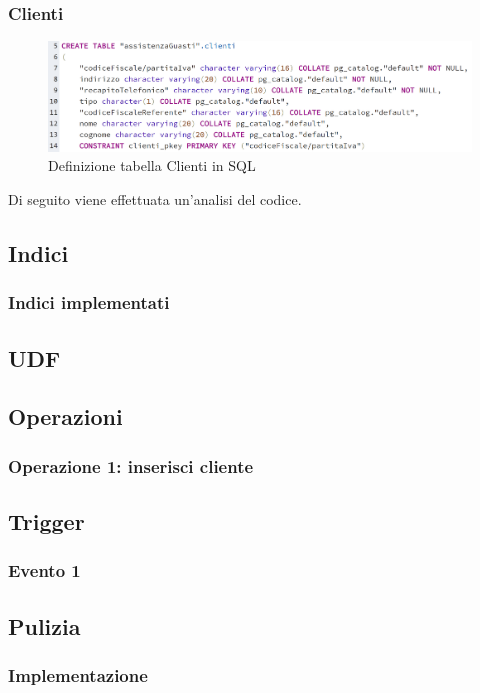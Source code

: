 \documentclass[legalpaper]{article}
\begin{document}
	\subsubsection{Clienti}
		\begin{figure}[h]
			\centering
			\includegraphics[width=0.9\linewidth]{Immagini SQL/Clienti}
			\caption{Definizione tabella Clienti in SQL}
			\label{clientisql}
		\end{figure}
		Di seguito viene effettuata un'analisi del codice. \\
		
\subsection{Indici}
\subsubsection{Indici implementati}
\subsection{UDF}
\subsection{Operazioni}
\subsubsection{Operazione 1: inserisci cliente}
\subsection{Trigger}
\subsubsection{Evento 1}
\subsection{Pulizia}
\subsubsection{Implementazione}
\newpage
\end{document}
